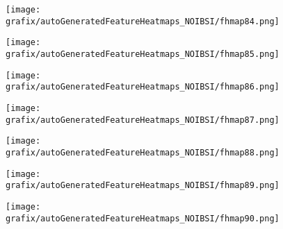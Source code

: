 \begin{subfigure}{\wid\textwidth} 
    \centering 
    \caption{\tiny \sffamily {}} 
    \vspace{\vsp} 
    \texttt{[image: grafix/autoGeneratedFeatureHeatmaps\_NOIBSI/fhmap84.png]} 
\end{subfigure} 
\hspace{\hsp} 
\begin{subfigure}{\wid\textwidth} 
    \centering 
    \caption{\tiny \sffamily {}} 
    \vspace{\vsp} 
    \texttt{[image: grafix/autoGeneratedFeatureHeatmaps\_NOIBSI/fhmap85.png]} 
\end{subfigure} 
\hspace{\hsp} 
\begin{subfigure}{\wid\textwidth} 
    \centering 
    \caption{\tiny \sffamily {}} 
    \vspace{\vsp} 
    \texttt{[image: grafix/autoGeneratedFeatureHeatmaps\_NOIBSI/fhmap86.png]} 
\end{subfigure} 
\hspace{\hsp} 
\begin{subfigure}{\wid\textwidth} 
    \centering 
    \caption{\tiny \sffamily {}} 
    \vspace{\vsp} 
    \texttt{[image: grafix/autoGeneratedFeatureHeatmaps\_NOIBSI/fhmap87.png]} 
\end{subfigure} 
\hspace{\hsp} 
\begin{subfigure}{\wid\textwidth} 
    \centering 
    \caption{\tiny \sffamily {}} 
    \vspace{\vsp} 
    \texttt{[image: grafix/autoGeneratedFeatureHeatmaps\_NOIBSI/fhmap88.png]} 
\end{subfigure} 
\hspace{\hsp} 
\begin{subfigure}{\wid\textwidth} 
    \centering 
    \caption{\tiny \sffamily {}} 
    \vspace{\vsp} 
    \texttt{[image: grafix/autoGeneratedFeatureHeatmaps\_NOIBSI/fhmap89.png]} 
\end{subfigure} 
\hspace{\hsp} 
\begin{subfigure}{\wid\textwidth} 
    \centering 
    \caption{\tiny \sffamily {}} 
    \vspace{\vsp} 
    \texttt{[image: grafix/autoGeneratedFeatureHeatmaps\_NOIBSI/fhmap90.png]} 
\end{subfigure} 
